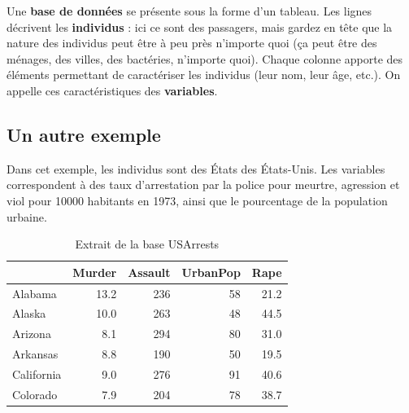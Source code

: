 \documentclass[
  french,
]{book}
\begin{document}
\begin{table}

\caption{\label{tab:titanic}Extrait de la base de données des passagers du Titanic}
\centering
{}
\end{table}

Une \textbf{base de données} se présente sous la forme d'un tableau. Les lignes décrivent les \textbf{individus} : ici ce sont des passagers, mais gardez en tête que la nature des individus peut être à peu près n'importe quoi (ça peut être des ménages, des villes, des bactéries, n'importe quoi). Chaque colonne apporte des éléments permettant de caractériser les individus (leur nom, leur âge, etc.). On appelle ces caractéristiques des \textbf{variables}.

\hypertarget{un-autre-exemple}{%
\subsection{Un autre exemple}\label{un-autre-exemple}}

Dans cet exemple, les individus sont des États des États-Unis. Les variables correspondent à des taux d'arrestation par la police pour meurtre, agression et viol pour 10000 habitants en 1973, ainsi que le pourcentage de la population urbaine.

\begin{table}

\caption{\label{tab:unnamed-chunk-2}Extrait de la base USArrests}
\centering
\begin{tabular}[t]{l|r|r|r|r}
\hline
  & Murder & Assault & UrbanPop & Rape\\
\hline
Alabama & 13.2 & 236 & 58 & 21.2\\
\hline
Alaska & 10.0 & 263 & 48 & 44.5\\
\hline
Arizona & 8.1 & 294 & 80 & 31.0\\
\hline
Arkansas & 8.8 & 190 & 50 & 19.5\\
\hline
California & 9.0 & 276 & 91 & 40.6\\
\hline
Colorado & 7.9 & 204 & 78 & 38.7\\
\hline
\end{tabular}
\end{table}
\end{document}
